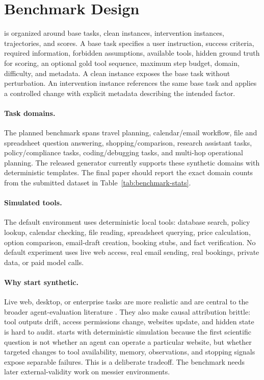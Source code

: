 \section{Benchmark Design}

\benchmark is organized around base tasks, clean instances, intervention instances, trajectories, and scores. A base task specifies a user instruction, success criteria, required information, forbidden assumptions, available tools, hidden ground truth for scoring, an optional gold tool sequence, maximum step budget, domain, difficulty, and metadata. A clean instance exposes the base task without perturbation. An intervention instance references the same base task and applies a controlled change with explicit metadata describing the intended factor.

\paragraph{Task domains.}
The planned benchmark spans travel planning, calendar/email workflow, file and spreadsheet question answering, shopping/comparison, research assistant tasks, policy/compliance tasks, coding/debugging tasks, and multi-hop operational planning. The released generator currently supports these synthetic domains with deterministic templates. The final paper should report the exact domain counts from the submitted dataset in Table~\ref{tab:benchmark-stats}.

\paragraph{Simulated tools.}
The default environment uses deterministic local tools: database search, policy lookup, calendar checking, file reading, spreadsheet querying, price calculation, option comparison, email-draft creation, booking stubs, and fact verification. No default experiment uses live web access, real email sending, real bookings, private data, or paid model calls.

\paragraph{Why start synthetic.}
Live web, desktop, or enterprise tasks are more realistic and are central to the broader agent-evaluation literature \citep{deng2023mind2webgeneralistagentweb,zhou2024webarenarealisticwebenvironment,jimenez2024swebenchlanguagemodelsresolve}. They also make causal attribution brittle: tool outputs drift, access permissions change, websites update, and hidden state is hard to audit. \benchmark starts with deterministic simulation because the first scientific question is not whether an agent can operate a particular website, but whether targeted changes to tool availability, memory, observations, and stopping signals expose separable failures. This is a deliberate tradeoff. The benchmark needs later external-validity work on messier environments.

